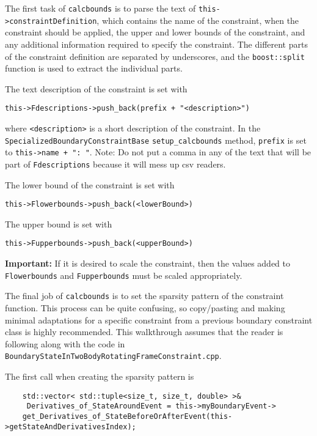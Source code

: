\documentclass[11pt]{article}
\begin{document}
The first task of \texttt{calcbounds} is to parse the text of \texttt{this->constraintDefinition}, which contains the name of the constraint, when the constraint should be applied, the upper and lower bounds of the constraint, and any additional information required to specify the constraint. The different parts of the constraint definition are separated by underscores, and the \texttt{boost::split} function is used to extract the individual parts.

The text description of the constraint is set with

\texttt{this->Fdescriptions->push\_back(prefix + "<description>")}

where \texttt{<description>} is a short description of the constraint. In the \texttt{SpecializedBoundaryConstraintBase} \texttt{setup\_calcbounds} method, \texttt{prefix} is set to \texttt{this->name + ": "}. Note: Do not put a comma in any of the text that will be part of \texttt{Fdescriptions} because it will mess up csv readers.

The lower bound of the constraint is set with

\texttt{this->Flowerbounds->push\_back(<lowerBound>)}

The upper bound is set with

\texttt{this->Fupperbounds->push\_back(<upperBound>)}

\textbf{Important:} If it is desired to scale the constraint, then the values added to \texttt{Flowerbounds} and \texttt{Fupperbounds} must be scaled appropriately.

The final job of \texttt{calcbounds} is to set the sparsity pattern of the constraint function. This process can be quite confusing, so copy/pasting and making minimal adaptations for a specific constraint from a previous boundary constraint class is highly recommended. This walkthrough assumes that the reader is following along with the code in \texttt{BoundaryStateInTwoBodyRotatingFrameConstraint.cpp}.

The first call when creating the sparsity pattern is

\begin{verbatim}
	std::vector< std::tuple<size_t, size_t, double> >&
	 Derivatives_of_StateAroundEvent = this->myBoundaryEvent->
	get_Derivatives_of_StateBeforeOrAfterEvent(this->getStateAndDerivativesIndex);
\end{verbatim}
\end{document}
